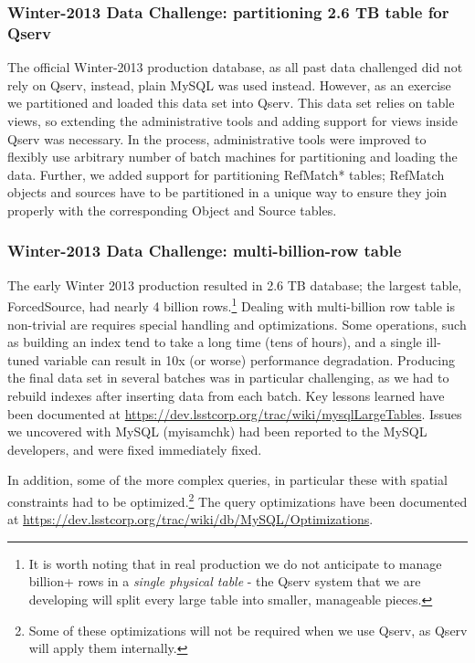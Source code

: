\documentclass[DM,lsstdraft,toc]{lsstdoc}
\begin{document}
\subsubsection{Winter-2013 Data Challenge: partitioning 2.6 TB table for
Qserv}\label{winter-2013-data-challenge-partitioning-2.6-tb-table-for-qserv}

The official Winter-2013 production database, as all past data
challenged did not rely on Qserv, instead, plain MySQL was used instead.
However, as an exercise we partitioned and loaded this data set into
Qserv. This data set relies on table views, so extending the
administrative tools and adding support for views inside Qserv was
necessary. In the process, administrative tools were improved to
flexibly use arbitrary number of batch machines for partitioning and
loading the data. Further, we added support for partitioning RefMatch*
tables; RefMatch objects and sources have to be partitioned in a unique
way to ensure they join properly with the corresponding Object and
Source tables.

\subsubsection{Winter-2013 Data Challenge: multi-billion-row
table}\label{winter-2013-data-challenge-multi-billion-row-table}

The early Winter 2013 production resulted in 2.6 TB database; the
largest table, ForcedSource, had nearly 4 billion rows.\footnote{It is
  worth noting that in real production we do not anticipate to manage
  billion+ rows in a \emph{single physical table} - the Qserv system
  that we are developing will split every large table into smaller,
  manageable pieces.} Dealing with multi-billion row table is
non-trivial are requires special handling and optimizations. Some
operations, such as building an index tend to take a long time (tens of
hours), and a single ill-tuned variable can result in 10x (or worse)
performance degradation. Producing the final data set in several batches
was in particular challenging, as we had to rebuild indexes after
inserting data from each batch. Key lessons learned have been documented
at \url{https://dev.lsstcorp.org/trac/wiki/mysqlLargeTables}. Issues we
uncovered with MySQL (myisamchk) had been reported to the MySQL
developers, and were fixed immediately fixed.

In addition, some of the more complex queries, in particular these with
spatial constraints had to be optimized.\footnote{Some of these
  optimizations will not be required when we use Qserv, as Qserv will
  apply them internally.} The query optimizations have been documented
at \url{https://dev.lsstcorp.org/trac/wiki/db/MySQL/Optimizations}.
\end{document}
